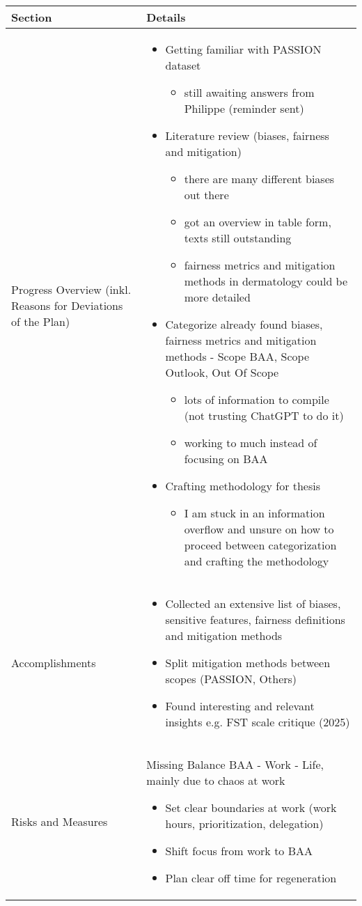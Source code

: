 \documentclass[a4paper,11pt]{article}
\newcommand{\done}{\textcolor{green}{\ding{52}}}
\newcommand{\ongoing}{\textcolor{orange}{\ding{45}}}
\newcommand{\notstarted}{\textcolor{red}{\ding{56}}}
\begin{document}
	
	\renewcommand{\arraystretch}{1.5}
	\begin{longtable}{|p{3.5cm}|p{12cm}|}
		\hline
		\textbf{Section} & \textbf{Details} \\
		\hline
		Progress Overview (inkl. Reasons for Deviations of the Plan) &
		
		\begin{itemize}
			\item[\ongoing] Getting familiar with PASSION dataset
			\begin{itemize}
				\item still awaiting answers from Philippe (reminder sent)
			\end{itemize}
			\item[\ongoing] Literature review (biases, fairness and mitigation)
			\begin{itemize}
				\item there are many different biases out there
				\item got an overview in table form, texts still outstanding
				\item fairness metrics and mitigation methods in dermatology could be more detailed 
			\end{itemize}
			\item[\ongoing] Categorize already found biases, fairness metrics and mitigation methods - Scope BAA, Scope Outlook, Out Of Scope
			\begin{itemize}
				\item lots of information to compile (not trusting ChatGPT to do it)
				\item working to much instead of focusing on BAA
			\end{itemize}
			\item[\notstarted] Crafting methodology for thesis
			\begin{itemize}
				\item I am stuck in an information overflow and unsure on how to proceed between categorization and crafting the methodology
			\end{itemize}
		\end{itemize} \\
		\hline
		Accomplishments & \begin{itemize}
			\item[\done] Collected an extensive list of biases, sensitive features, fairness definitions and mitigation methods
			\item[\done] Split mitigation methods between scopes (PASSION, Others)
			\item[\done] Found interesting and relevant insights e.g. FST scale critique (2025)
		\end{itemize} \\
		\hline
		Risks and Measures & 
		Missing Balance BAA - Work - Life, mainly due to chaos at work
		\begin{itemize}
			\item Set clear boundaries at work (work hours, prioritization, delegation)
			\item Shift focus from work to BAA
			\item Plan clear off time for regeneration
		\end{itemize}
		

\end{longtable}
\end{document}

